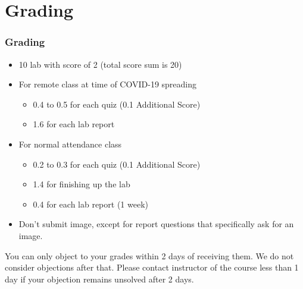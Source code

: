 \documentclass[aspectratio=169,15pt]{beamer}
\begin{document}
\section{Grading}
\begin{frame}
    \frametitle{Grading}

    \begin{itemize}
        \item 10 lab with score of \alert{2} (total score sum is \alert{20})
        \item For remote class at time of \alert{COVID-19} spreading
        \begin{itemize}
            \item {\color{red} 0.4} to {\color{red} 0.5} for each quiz (0.1 Additional Score)
            \item {\color{red} 1.6} for each lab report
        \end{itemize}
        \item For normal attendance class
        \begin{itemize}
            \item {\color{red} 0.2} to {\color{red} 0.3} for each quiz (0.1 Additional Score)
            \item {\color{red} 1.4} for finishing up the lab
            \item {\color{red} 0.4} for each lab report (1 week)
        \end{itemize}
        \item Don’t submit image, except for report questions that specifically ask for an image.
    \end{itemize}
    \begin{alertblock}{}
        You can only object to your grades within {\color{red} 2 days} of receiving them.
        We do not consider objections after that.
        Please contact instructor of the course less than 1 day if your objection remains unsolved after 2 days.
    \end{alertblock}

\end{frame}
\end{document}
